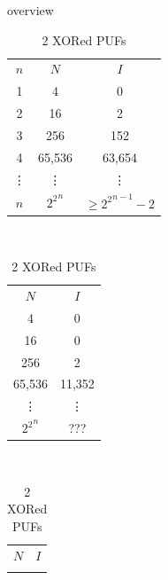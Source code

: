 \documentclass[10pt, compress]{beamer}
\begin{document}
\begin{frame}{overview}

    \begin{table}[H]
    \caption{Function Overview}
    \label{function_overview}    
    \def\arraystretch{1.45}
        \begin{subtable}{0.40\textwidth}
            \centering
            \begin{tabular}{|c|c|c|}
            \hline
            $n$     & $N$       & $I$                       \\ \Xhline{5\arrayrulewidth}
            1       & 4         & 0                         \\ \hline
            2       & 16        & 2                         \\ \hline
            3       & 256       & 152                       \\ \hline
            4       & 65,536    & 63,654                    \\ \hline
            \vdots  & \vdots    & \vdots                    \\ \hline
            $n$     & ${2^2}^n$ & $\geq	{2^2}^{n-1} - 2$    \\ \hline
            \end{tabular}
        \caption{One single PUF}
        \end{subtable}
        ~ 
        \begin{subtable}{0.28\textwidth}
            \centering
            \begin{tabular}{|c|c|}
            \hline
            $N$       & $I$       \\ \Xhline{5\arrayrulewidth}
            4         & 0         \\ \hline
            16        & 0         \\ \hline
            256       & 2         \\ \hline
            65,536    & 11,352    \\ \hline
            \vdots    & \vdots    \\ \hline
            ${2^2}^n$ & ???       \\ \hline
            \end{tabular}
        \caption{2 XORed PUFs}
        \end{subtable}
        ~
        \begin{subtable}{0.23\textwidth}
            \centering
            \begin{tabular}{|c|c|}
            \hline
            $N$       & $I$       \\ \Xhline{5\arrayrulewidth}

\end{tabular}
\end{subtable}
\end{table}
\end{frame}
\end{document}
